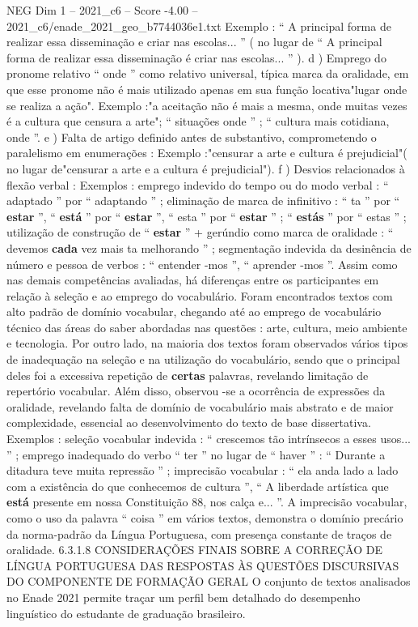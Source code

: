 \begin{textsample}{NEG Dim 1 – 2021\_c6 – Score -4.00 – 2021\_c6/enade\_2021\_geo\_b7744036e1.txt}
Exemplo : “ A principal forma de realizar essa disseminação e criar nas escolas... ” ( no lugar de “ A principal forma de realizar essa disseminação é criar nas escolas... ” ). d ) Emprego do pronome relativo “ onde ” como relativo universal, típica marca da oralidade, em que esse pronome não é mais utilizado apenas em sua função locativa"lugar onde se realiza a ação".
Exemplo :"a aceitação não é mais a mesma, onde muitas vezes é a cultura que censura a arte"; “ situações onde ” ; “ cultura mais cotidiana, onde ”. e ) Falta de artigo definido antes de substantivo, comprometendo o paralelismo em enumerações : Exemplo :"censurar a arte e cultura é prejudicial"( no lugar de"censurar a arte e a cultura é prejudicial"). f ) Desvios relacionados à flexão verbal : Exemplos : emprego indevido do tempo ou do modo verbal : “ adaptado ” por “ adaptando ” ; eliminação de marca de infinitivo : “ ta ” por “ \textbf{estar} ”, “ \textbf{está} ” por “ \textbf{estar} ”, “ esta ” por “ \textbf{estar} ” ; “ \textbf{estás} ” por “ estas ” ; utilização de construção de “ \textbf{estar} ” + gerúndio como marca de oralidade : “ devemos \textbf{cada} vez mais ta melhorando ” ; segmentação indevida da desinência de número e pessoa de verbos : “ entender -mos ”, “ aprender -mos ”.
Assim como nas demais competências avaliadas, há diferenças entre os participantes em relação à seleção e ao emprego do vocabulário.
Foram encontrados textos com alto padrão de domínio vocabular, chegando até ao emprego de vocabulário técnico das áreas do saber abordadas nas questões : arte, cultura, meio ambiente e tecnologia.
Por outro lado, na maioria dos textos foram observados vários tipos de inadequação na seleção e na utilização do vocabulário, sendo que o principal deles foi a excessiva repetição de \textbf{certas} palavras, revelando limitação de repertório vocabular.
Além disso, observou -se a ocorrência de expressões da oralidade, revelando falta de domínio de vocabulário mais abstrato e de maior complexidade, essencial ao desenvolvimento do texto de base dissertativa.
Exemplos : seleção vocabular indevida : “ crescemos tão intrínsecos a esses usos... ” ; emprego inadequado do verbo “ ter ” no lugar de “ haver ” : “ Durante a ditadura teve muita repressão ” ; imprecisão vocabular : “ ela anda lado a lado com a existência do que conhecemos de cultura ”, “ A liberdade artística que \textbf{está} presente em nossa Constituição 88, nos calça e... ”.
A imprecisão vocabular, como o uso da palavra “ coisa ” em vários textos, demonstra o domínio precário da norma-padrão da Língua Portuguesa, com presença constante de traços de oralidade. 6.3.1.8 CONSIDERAÇÕES FINAIS SOBRE A CORREÇÃO DE LÍNGUA PORTUGUESA DAS RESPOSTAS ÀS QUESTÕES DISCURSIVAS DO COMPONENTE DE FORMAÇÃO GERAL O conjunto de textos analisados no Enade 2021 permite traçar um perfil bem detalhado do desempenho linguístico do estudante de graduação brasileiro.

\end{textsample}
